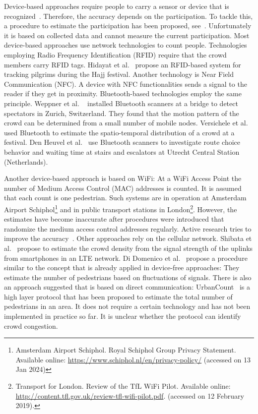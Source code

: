 Device-based approaches require people to carry a sensor or device that is recognized~\cite{kouyoumdjieva-2019-cdyn}. Therefore, the accuracy depends on the participation. To tackle this, a procedure to estimate the participation has been proposed, see~\cite{nicolai-2007-com}. Unfortunately it is based on collected data and cannot measure the current participation. Most device-based approaches use network technologies to count people. 
Technologies employing Radio Frequency Identification (RFID) require that the crowd members carry RFID tags. Hidayat et al.~\cite{hidayat-2019-com} propose an RFID-based system for tracking pilgrims during the Hajj festival. Another technology is Near Field Communication (NFC). A device with NFC functionalities sends a signal to the reader if they get in proximity. Bluetooth-based technologies employ the same principle.  
Weppner et al. ~\cite{weppner-2014-com} installed Bluetooth scanners at a bridge to detect spectators in Zurich, Switzerland. They found that the motion pattern of the crowd can be determined from a small number of mobile nodes. Versichele et al.~\cite{versichele-2012-com} used Bluetooth to estimate the spatio-temporal distribution of a crowd at a festival. Den Heuvel et al.~\cite{heuvel-2015-cdyn} use Bluetooth scanners to investigate route choice behavior and waiting time at stairs and escalators at Utrecht Central Station (Netherlands).


Another device-based approach is based on WiFi: At a WiFi Access Point the number of Medium Access Control (MAC) addresses is counted. It is assumed that each count is one pedestrian. Such systems are in operation at Amsterdam Airport Schiphol\footnote{Amsterdam Airport Schiphol. Royal Schiphol Group Privacy Statement. Available online: \url{https://www.schiphol.nl/en/privacy-policy/} (accessed on 13 Jan 2024) } and in public transport stations in
London\footnote{Transport for London. Review of the TfL WiFi Pilot. Available online: \url{http://content.tfl.gov.uk/review-tfl-wifi-pilot.pdf}. (accessed on 12 February 2019).}.
However, the estimates have become inaccurate after procedures were introduced that randomize the medium access control addresses regularly. Active research tries to improve the accuracy~\cite{nitti-2020-com,vega-2021-com}. 
Other approaches rely on the cellular network.
Shibata et al.~\cite{shibata-2019-com} propose to estimate the crowd density from the signal strength of the uplinks from smartphones in an LTE network. Di Domenico et al.~\cite{domenico-2017-com} propose a procedure similar to the concept that is already applied in device-free approaches: They estimate the number of pedestrians based on fluctuations of signals. There is also an approach suggested that is based on direct communication: UrbanCount~\cite{danielis-2017-com} is a high layer protocol that has been proposed to estimate the total number of pedestrians in an area. It does not require a certain technology and has not been implemented in practice so far. It is unclear whether the protocol can identify crowd congestion.




